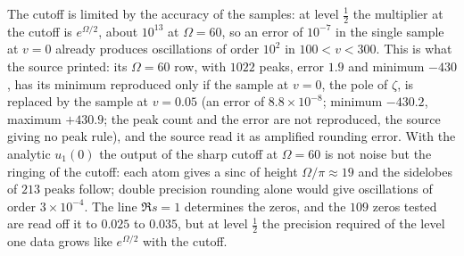 The cutoff is limited by the accuracy of the samples: at level $\tfrac12$ the multiplier at the cutoff is $e^{\Omega/2}$, about $10^{13}$ at $\Omega=60$, so an error of $10^{-7}$ in the single sample at $v=0$ already produces oscillations of order $10^2$ in $100<v<300$. This is what the source printed: its $\Omega=60$ row, with $1022$ peaks, error $1.9$ and minimum $-430$, has its minimum reproduced only if the sample at $v=0$, the pole of $\zeta$, is replaced by the sample at $v=0.05$ (an error of $8.8\times10^{-8}$; minimum $-430.2$, maximum $+430.9$; the peak count and the error are not reproduced, the source giving no peak rule), and the source read it as amplified rounding error. With the analytic $u_1(0)$ the output of the sharp cutoff at $\Omega=60$ is not noise but the ringing of the cutoff: each atom gives a sinc of height $\Omega/\pi\approx19$ and the sidelobes of $213$ peaks follow; double precision rounding alone would give oscillations of order $3\times10^{-4}$. The line $\Re s=1$ determines the zeros, and the $109$ zeros tested are read off it to $0.025$ to $0.035$, but at level $\tfrac12$ the precision required of the level one data grows like $e^{\Omega/2}$ with the cutoff.
